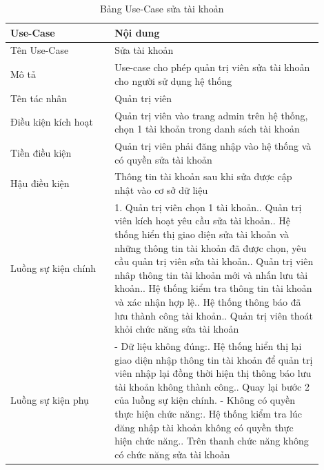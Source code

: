 \begin{longtable}[htp]{ |m{0.3\linewidth}|m{0.6\linewidth}|}
 \caption{Bảng Use-Case sửa tài khoản \label{long}}\\
 \hline
 Use-Case & Nội dung \\
 \hline
 Tên Use-Case & Sửa tài khoản \\
 \hline
 Mô tả & Use-case cho phép quản trị viên sửa tài khoản cho người sử dụng hệ thống\\
 \hline
 Tên tác nhân & Quản trị viên\\
 \hline
 Điều kiện kích hoạt & Quản trị viên vào trang admin trên hệ thống, chọn 1 tài khoản trong danh sách tài khoản\\
 \hline
 Tiền điều kiện & Quản trị viên phải đăng nhập vào hệ thống và có quyền sửa tài khoản\\
 \hline
 Hậu điều kiện & Thông tin tài khoản sau khi sửa được cập nhật vào cơ sở dữ liệu\\
 \hline
 Luồng sự kiện chính & 
 1. Quản trị viên chọn 1 tài khoản.\newline
 2. Quản trị viên kích hoạt yêu cầu sửa tài khoản.\newline
 3. Hệ thống hiển thị giao diện sửa tài khoản và những thông tin tài khoản đã được chọn, yêu cầu quản trị viên sửa tài khoản.\newline
 4. Quản trị viên nhâp thông tin tài khoản mới và nhấn lưu tài khoản.\newline
 5. Hệ thống kiểm tra thông tin tài khoản và xác nhận hợp lệ.\newline
 6. Hệ thống thông báo đã lưu thành công tài khoản.\newline	
 7. Quản trị viên thoát khỏi chức năng sửa tài khoản
 \\
 \hline
 Luồng sự kiện phụ & 
 - Dữ liệu không đúng:\newline
  1. Hệ thống hiển thị lại giao diện nhập thông tin tài khoản để quản trị viên nhập lại đồng thời hiện thị thông báo lưu tài khoản không thành công.\newline
  2. Quay lại bước 2 của luồng sự kiện chính.\newline
  - Không có quyền thực hiện chức năng:\newline
  1. Hệ thống kiểm tra lúc đăng nhập tài khoản không có quyền thực hiện chức năng.\newline
  2. Trên thanh chức năng không có chức năng sửa tài khoản
 \\
 \hline
\end{longtable}

